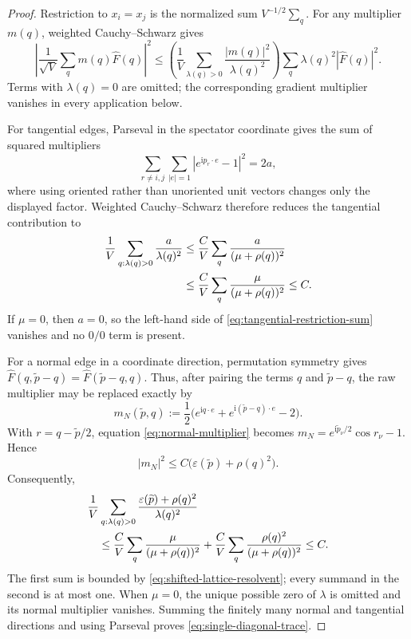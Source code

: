 \documentclass[10pt,a4paper]{amsart}
\begin{document}
\begin{proof}
Restriction to \(x_i=x_j\) is the normalized sum
\(V^{-1/2}\sum_q\).  For any multiplier \(m(q)\), weighted
Cauchy--Schwarz gives
\begin{equation}
 \left|\frac1{\sqrt V}\sum_qm(q)\widehat F(q)\right|^2
 \leq
 \left(\frac1V\sum_{\lambda(q)>0}
 \frac{|m(q)|^2}{\lambda(q)^2}\right)
 \sum_q\lambda(q)^2|\widehat F(q)|^2.
 \label{eq:weighted-restriction-cs}
\end{equation}
Terms with \(\lambda(q)=0\) are omitted; the corresponding gradient
multiplier vanishes in every application below.

For tangential edges, Parseval in the spectator coordinate gives the sum
of squared multipliers
\[
 \sum_{r\ne i,j}\sum_{|e|=1}
 |e^{\mathrm i p_r\cdot e}-1|^2=2a,
\]
where using oriented rather than unoriented unit vectors changes only the
displayed factor.  Weighted Cauchy--Schwarz therefore reduces
the tangential contribution to
\begin{align}
 \frac1V\sum_{q:\lambda(q)>0}\frac{a}{\lambda(q)^2}
 &\leq \frac C V\sum_q\frac{a}{(\mu+\rho(q))^2} \notag\\
 &\leq \frac C V\sum_q\frac{\mu}{(\mu+\rho(q))^2}
 \leq C.
 \label{eq:tangential-restriction-sum}
\end{align}
If \(\mu=0\), then \(a=0\), so the left-hand side of
\eqref{eq:tangential-restriction-sum} vanishes and no \(0/0\) term is
present.

For a normal edge in a coordinate direction, permutation symmetry gives
\(\widehat F(q,\widetilde p-q)=
  \widehat F(\widetilde p-q,q)\).  Thus, after pairing the terms
\(q\) and \(\widetilde p-q\), the raw multiplier may be replaced exactly
by
\begin{equation}
 m_N(\widetilde p,q)
 :=\frac12\bigl(e^{\mathrm iq\cdot e}
 +e^{\mathrm i(\widetilde p-q)\cdot e}-2\bigr).
 \label{eq:normal-multiplier}
\end{equation}
With \(r=q-\widetilde p/2\), equation \eqref{eq:normal-multiplier} becomes
\(m_N=e^{\mathrm i\widetilde p_\nu/2}\cos r_\nu-1\).  Hence
\[
 |m_N|^2
 \leq C\bigl(\varepsilon(\widetilde p)+\rho(q)^2\bigr).
\]
Consequently,
\begin{align}
 &\frac1V\sum_{q:\lambda(q)>0}
 \frac{\varepsilon(\widetilde p)+\rho(q)^2}{\lambda(q)^2}
 \notag\\
 &\quad\leq
 \frac C V\sum_q\frac{\mu}{(\mu+\rho(q))^2}
 +\frac C V\sum_q\frac{\rho(q)^2}{(\mu+\rho(q))^2}
 \leq C.
 \label{eq:normal-restriction-sum}
\end{align}
The first sum is bounded by \eqref{eq:shifted-lattice-resolvent}; every
summand in the second is at most one.  When \(\mu=0\), the unique possible
zero of \(\lambda\) is omitted and its normal multiplier vanishes.
Summing the finitely many normal and tangential directions and using
Parseval proves \eqref{eq:single-diagonal-trace}.
\end{proof}
\end{document}
